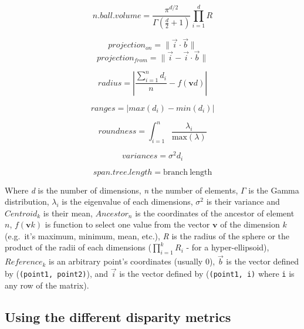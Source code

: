 \documentclass[
]{book}
\begin{document}
\begin{equation}
    n.ball.volume = \frac{\pi^{d/2}}{\Gamma(\frac{d}{2}+1)}\displaystyle\prod_{i=1}^{d} R
\end{equation}

\begin{equation}
    projection_{on} = \| \overrightarrow{i} \cdot \overrightarrow{b} \|
\end{equation}
\begin{equation}
    projection_{from} = \| \overrightarrow{i} - \overrightarrow{i} \cdot \overrightarrow{b} \|
\end{equation}

\begin{equation}
    radius = |\frac{\sum_{i=1}^{n}d_i}{n} - f(\mathbf{v}d)|
\end{equation}

\begin{equation}
    ranges = |max(d_i) - min(d_i)|
\end{equation}

\begin{equation}
    roundness = \int_{i = 1}^{n}{\frac{\lambda_{i}}{\text{max}(\lambda)}}
\end{equation}

\begin{equation}
    variances = \sigma^{2}{d_i}
\end{equation}

\begin{equation}
    span.tree.length = \mathrm{branch\ length}
\end{equation}

Where \emph{d} is the number of dimensions,
\emph{n} the number of elements,
\(\Gamma\) is the Gamma distribution,
\(\lambda_i\) is the eigenvalue of each dimensions,
\(\sigma^{2}\) is their variance and
\(Centroid_{k}\) is their mean,
\(Ancestor_{n}\) is the coordinates of the ancestor of element \(n\),
\(f(\mathbf{v}k)\) is function to select one value from the vector \(\mathbf{v}\) of the dimension \(k\) (e.g.~it's maximum, minimum, mean, etc.),
\emph{R} is the radius of the sphere or the product of the radii of each dimensions (\(\displaystyle\prod_{i=1}^{k}R_{i}\) - for a hyper-ellipsoid),
\(Reference_{k}\) is an arbitrary point's coordinates (usually 0),
\(\overrightarrow{b}\) is the vector defined by (\texttt{(point1,\ point2)}),
and \(\overrightarrow{i}\) is the vector defined by (\texttt{(point1,\ i)} where \texttt{i} is any row of the matrix).

\hypertarget{using-the-different-disparity-metrics}{%
\subsection{Using the different disparity metrics}\label{using-the-different-disparity-metrics}}
\end{document}
